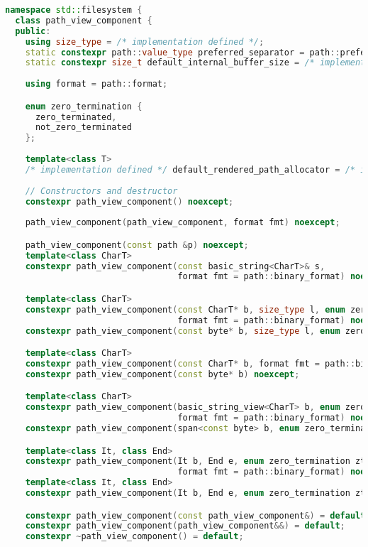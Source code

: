 \documentclass[11pt]{article}
\begin{document}
\begin{lstlisting}[language=cpp]
namespace std::filesystem {
  class path_view_component {
  public:
    using size_type = /* implementation defined */;
    static constexpr path::value_type preferred_separator = path::preferred_separator;
    static constexpr size_t default_internal_buffer_size = /* implementation defined */;
    
    using format = path::format;

    enum zero_termination {
      zero_terminated,
      not_zero_terminated
    };
    
    template<class T>
    /* implementation defined */ default_rendered_path_allocator = /* implementation defined */;
    
    // Constructors and destructor
    constexpr path_view_component() noexcept;
    
    path_view_component(path_view_component, format fmt) noexcept;

    path_view_component(const path &p) noexcept;
    template<class CharT>
    constexpr path_view_component(const basic_string<CharT>& s,
                                  format fmt = path::binary_format) noexcept;

    template<class CharT>
    constexpr path_view_component(const CharT* b, size_type l, enum zero_termination zt,
                                  format fmt = path::binary_format) noexcept;
    constexpr path_view_component(const byte* b, size_type l, enum zero_termination zt) noexcept;

    template<class CharT>
    constexpr path_view_component(const CharT* b, format fmt = path::binary_format) noexcept;
    constexpr path_view_component(const byte* b) noexcept;

    template<class CharT>
    constexpr path_view_component(basic_string_view<CharT> b, enum zero_termination zt,
                                  format fmt = path::binary_format) noexcept;
    constexpr path_view_component(span<const byte> b, enum zero_termination zt) noexcept;

    template<class It, class End>
    constexpr path_view_component(It b, End e, enum zero_termination zt,
                                  format fmt = path::binary_format) noexcept;
    template<class It, class End>
    constexpr path_view_component(It b, End e, enum zero_termination zt) noexcept;

    constexpr path_view_component(const path_view_component&) = default;
    constexpr path_view_component(path_view_component&&) = default;
    constexpr ~path_view_component() = default;
    

\end{lstlisting}
\end{document}
